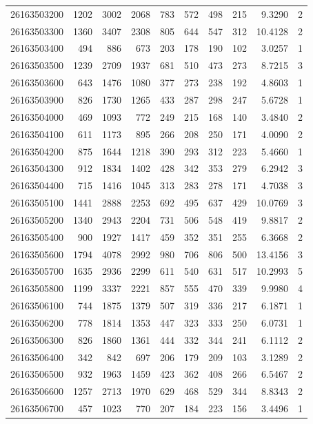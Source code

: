 \documentclass[
  11pt,
]{article}
\begin{document}
\begin{longtable}[t]{lrrrrrrrrr}
26163503200 & 1202 & 3002 & 2068 & 783 & 572 & 498 & 215 & 9.3290 & 2\\
26163503300 & 1360 & 3407 & 2308 & 805 & 644 & 547 & 312 & 10.4128 & 2\\
26163503400 & 494 & 886 & 673 & 203 & 178 & 190 & 102 & 3.0257 & 1\\
26163503500 & 1239 & 2709 & 1937 & 681 & 510 & 473 & 273 & 8.7215 & 3\\
26163503600 & 643 & 1476 & 1080 & 377 & 273 & 238 & 192 & 4.8603 & 1\\
26163503900 & 826 & 1730 & 1265 & 433 & 287 & 298 & 247 & 5.6728 & 1\\
26163504000 & 469 & 1093 & 772 & 249 & 215 & 168 & 140 & 3.4840 & 2\\
26163504100 & 611 & 1173 & 895 & 266 & 208 & 250 & 171 & 4.0090 & 2\\
26163504200 & 875 & 1644 & 1218 & 390 & 293 & 312 & 223 & 5.4660 & 1\\
26163504300 & 912 & 1834 & 1402 & 428 & 342 & 353 & 279 & 6.2942 & 3\\
26163504400 & 715 & 1416 & 1045 & 313 & 283 & 278 & 171 & 4.7038 & 3\\
26163505100 & 1441 & 2888 & 2253 & 692 & 495 & 637 & 429 & 10.0769 & 3\\
26163505200 & 1340 & 2943 & 2204 & 731 & 506 & 548 & 419 & 9.8817 & 2\\
26163505400 & 900 & 1927 & 1417 & 459 & 352 & 351 & 255 & 6.3668 & 2\\
26163505600 & 1794 & 4078 & 2992 & 980 & 706 & 806 & 500 & 13.4156 & 3\\
26163505700 & 1635 & 2936 & 2299 & 611 & 540 & 631 & 517 & 10.2993 & 5\\
26163505800 & 1199 & 3337 & 2221 & 857 & 555 & 470 & 339 & 9.9980 & 4\\
26163506100 & 744 & 1875 & 1379 & 507 & 319 & 336 & 217 & 6.1871 & 1\\
26163506200 & 778 & 1814 & 1353 & 447 & 323 & 333 & 250 & 6.0731 & 1\\
26163506300 & 826 & 1860 & 1361 & 444 & 332 & 344 & 241 & 6.1112 & 2\\
26163506400 & 342 & 842 & 697 & 206 & 179 & 209 & 103 & 3.1289 & 2\\
26163506500 & 932 & 1963 & 1459 & 423 & 362 & 408 & 266 & 6.5467 & 2\\
26163506600 & 1257 & 2713 & 1970 & 629 & 468 & 529 & 344 & 8.8343 & 2\\
26163506700 & 457 & 1023 & 770 & 207 & 184 & 223 & 156 & 3.4496 & 1\\

\end{longtable}
\end{document}

